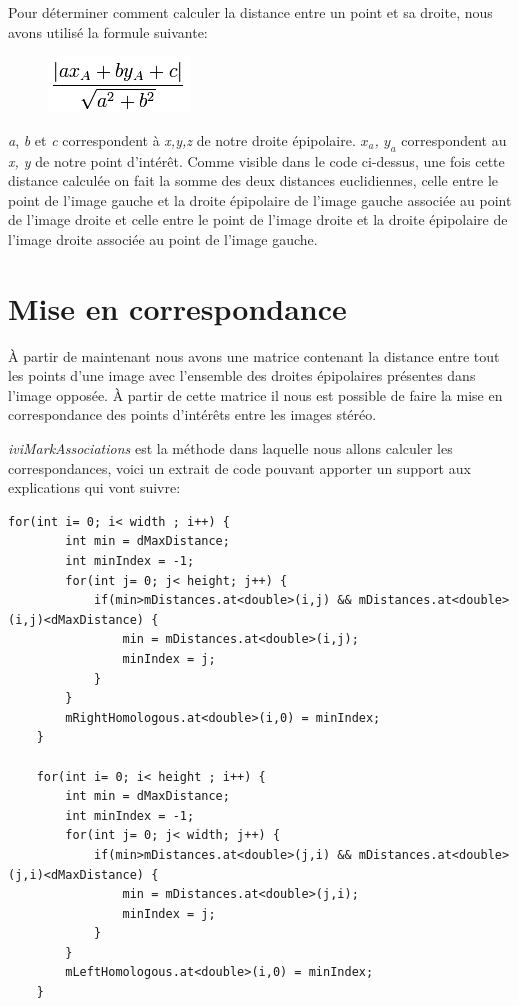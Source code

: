 \documentclass[a4paper,12pt]{report}
\begin{document}
Pour déterminer comment calculer la distance entre un point et sa droite, nous avons utilisé la formule suivante:

\begin{figure}[!ht]
	\center
	\includegraphics[scale=0.6]{./image/distance.png}
\end{figure}

\textit{a}, \textit{b} et \textit{c} correspondent à \textit{x,y,z} de notre droite épipolaire. \textit{$ x_{a} $, $ y_{a} $} correspondent au \textit{x, y} de notre point d'intérêt. Comme visible dans le code ci-dessus, une fois cette distance calculée on fait la somme des deux distances euclidiennes, celle entre le point de l'image gauche et la droite épipolaire de l'image gauche associée au point de l'image droite et celle entre le point de l'image droite et la droite épipolaire de l'image droite associée au point de l'image gauche.


\newpage

\section*{Mise en correspondance}

À partir de maintenant nous avons une matrice contenant la distance entre tout les points d'une image avec l'ensemble des droites épipolaires présentes dans l'image opposée. À partir de cette matrice il nous est possible de faire la mise en correspondance des points d'intérêts entre les images stéréo.

\textit{iviMarkAssociations} est la méthode dans laquelle nous allons calculer les correspondances, voici un extrait de code pouvant apporter un support aux explications qui vont suivre:


\begin{lstlisting}[style=C++]
 for(int i= 0; i< width ; i++) {
        int min = dMaxDistance;
        int minIndex = -1;
        for(int j= 0; j< height; j++) {
            if(min>mDistances.at<double>(i,j) && mDistances.at<double>(i,j)<dMaxDistance) {
                min = mDistances.at<double>(i,j);
                minIndex = j;
            }
        }
        mRightHomologous.at<double>(i,0) = minIndex;
    }

    for(int i= 0; i< height ; i++) {
        int min = dMaxDistance;
        int minIndex = -1;
        for(int j= 0; j< width; j++) {
            if(min>mDistances.at<double>(j,i) && mDistances.at<double>(j,i)<dMaxDistance) {
                min = mDistances.at<double>(j,i);
                minIndex = j;
            }
        }
        mLeftHomologous.at<double>(i,0) = minIndex;
    }
\end{lstlisting}
\end{document}
